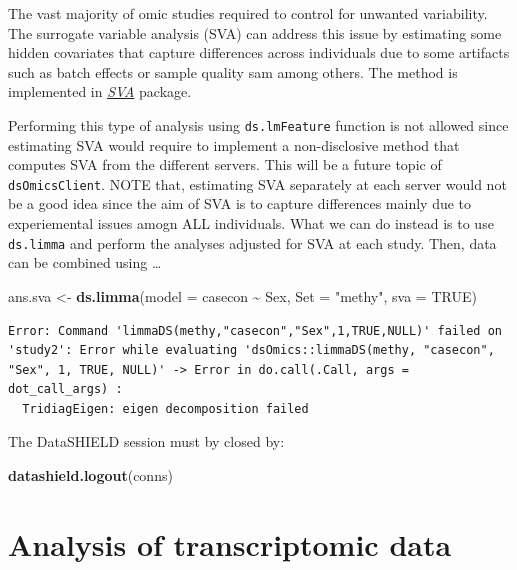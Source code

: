 \documentclass[]{article}
\newenvironment{Shaded}{\begin{snugshade}}{\end{snugshade}}
\newcommand{\DataTypeTok}[1]{\textcolor[rgb]{0.13,0.29,0.53}{#1}}
\newcommand{\KeywordTok}[1]{\textcolor[rgb]{0.13,0.29,0.53}{\textbf{#1}}}
\newcommand{\NormalTok}[1]{#1}
\newcommand{\OperatorTok}[1]{\textcolor[rgb]{0.81,0.36,0.00}{\textbf{#1}}}
\newcommand{\OtherTok}[1]{\textcolor[rgb]{0.56,0.35,0.01}{#1}}
\newcommand{\StringTok}[1]{\textcolor[rgb]{0.31,0.60,0.02}{#1}}
\begin{document}
The vast majority of omic studies required to control for unwanted
variability. The surrogate variable analysis (SVA) can address this
issue by estimating some hidden covariates that capture differences
across individuals due to some artifacts such as batch effects or sample
quality sam among others. The method is implemented in
\emph{\href{https://bioconductor.org/packages/3.9/SVA}{SVA}} package.

Performing this type of analysis using \texttt{ds.lmFeature} function is
not allowed since estimating SVA would require to implement a
non-disclosive method that computes SVA from the different servers. This
will be a future topic of \texttt{dsOmicsClient}. NOTE that, estimating
SVA separately at each server would not be a good idea since the aim of
SVA is to capture differences mainly due to experiemental issues amogn
ALL individuals. What we can do instead is to use \texttt{ds.limma} and
perform the analyses adjusted for SVA at each study. Then, data can be
combined using \ldots{}

\begin{Shaded}
\begin{Highlighting}[]
\NormalTok{ans.sva <{-}}\StringTok{ }\KeywordTok{ds.limma}\NormalTok{(}\DataTypeTok{model =}\NormalTok{ casecon }\OperatorTok{\textasciitilde{}}\StringTok{ }\NormalTok{Sex, }
                    \DataTypeTok{Set =} \StringTok{"methy"}\NormalTok{,}
                    \DataTypeTok{sva =} \OtherTok{TRUE}\NormalTok{)}
\end{Highlighting}
\end{Shaded}

\begin{verbatim}
Error: Command 'limmaDS(methy,"casecon","Sex",1,TRUE,NULL)' failed on 'study2': Error while evaluating 'dsOmics::limmaDS(methy, "casecon", "Sex", 1, TRUE, NULL)' -> Error in do.call(.Call, args = dot_call_args) : 
  TridiagEigen: eigen decomposition failed
\end{verbatim}

The DataSHIELD session must by closed by:

\begin{Shaded}
\begin{Highlighting}[]
\KeywordTok{datashield.logout}\NormalTok{(conns)}
\end{Highlighting}
\end{Shaded}

\hypertarget{analysis-of-transcriptomic-data}{%
\section{Analysis of transcriptomic
data}\label{analysis-of-transcriptomic-data}}
\end{document}
